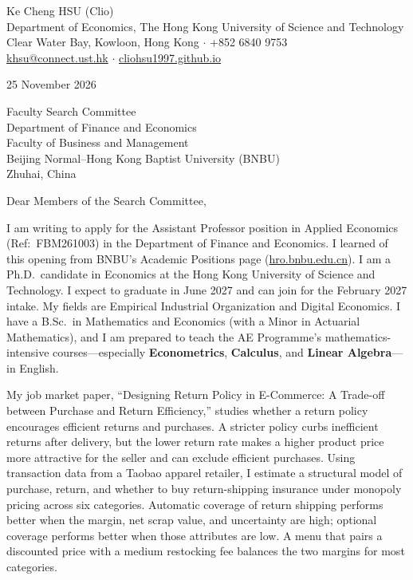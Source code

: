 \documentclass[11pt]{article}
\begin{document}
\begin{flushleft}
Ke Cheng HSU (Clio) \\
Department of Economics, The Hong Kong University of Science and Technology \\
Clear Water Bay, Kowloon, Hong Kong $\cdot$ +852 6840 9753 \\
\href{mailto:khsu@connect.ust.hk}{khsu@connect.ust.hk} $\cdot$ \href{https://cliohsu1997.github.io/}{cliohsu1997.github.io}
\end{flushleft}

25 November 2026

\vspace{0.1em}
Faculty Search Committee \\
Department of Finance and Economics \\
Faculty of Business and Management \\
Beijing Normal--Hong Kong Baptist University (BNBU) \\
Zhuhai, China

\vspace{0.1em}
Dear Members of the Search Committee,

I am writing to apply for the Assistant Professor position in Applied Economics (Ref:\ FBM261003) in the Department of Finance and Economics. I learned of this opening from BNBU's Academic Positions page (\href{https://hro.bnbu.edu.cn/Job_Opportunities_/Job_Vacancy/Academic_Positions.htm}{hro.bnbu.edu.cn}). I am a Ph.D.\ candidate in Economics at the Hong Kong University of Science and Technology. I expect to graduate in June 2027 and can join for the February 2027 intake. My fields are Empirical Industrial Organization and Digital Economics. I have a B.Sc.\ in Mathematics and Economics (with a Minor in Actuarial Mathematics), and I am prepared to teach the AE Programme's mathematics-intensive courses---especially \textbf{Econometrics}, \textbf{Calculus}, and \textbf{Linear Algebra}---in English.

My job market paper, ``Designing Return Policy in E-Commerce: A Trade-off between Purchase and Return Efficiency,'' studies whether a return policy encourages efficient returns and purchases. A stricter policy curbs inefficient returns after delivery, but the lower return rate makes a higher product price more attractive for the seller and can exclude efficient purchases. Using transaction data from a Taobao apparel retailer, I estimate a structural model of purchase, return, and whether to buy return-shipping insurance under monopoly pricing across six categories. Automatic coverage of return shipping performs better when the margin, net scrap value, and uncertainty are high; optional coverage performs better when those attributes are low. A menu that pairs a discounted price with a medium restocking fee balances the two margins for most categories.
\end{document}
